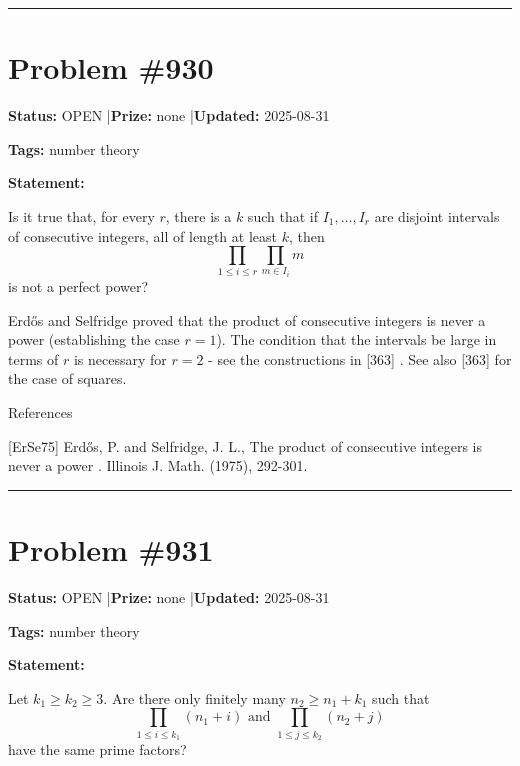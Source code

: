 \documentclass{article}
\begin{document}
\noindent\rule{\linewidth}{0.4pt}


\section{Problem \#930}
\label{prob:930}

\noindent\textbf{Status:} OPEN \quad|\quad \textbf{Prize:} none \quad|\quad \textbf{Updated:} 2025-08-31

\noindent\textbf{Tags:} number theory

\medskip

\noindent\textbf{Statement:}

Is it true that, for every $r$, there is a $k$ such that if $I_1,\ldots,I_r$ are disjoint intervals of consecutive integers, all of length at least $k$, then\[\prod_{1\leq i\leq r}\prod_{m\in I_i}m\]is not a perfect power?




Erd\H{o}s and Selfridge \cite{ErSe75} proved that the product of consecutive integers is never a power (establishing the case $r=1$). The condition that the intervals be large in terms of $r$ is necessary for $r=2$ - see the constructions in [363] . See also [363] for the case of squares.




References

[ErSe75] Erd\H{o}s, P. and Selfridge, J. L., The product of consecutive integers is never a power . Illinois J. Math. (1975), 292-301.

\noindent\rule{\linewidth}{0.4pt}


\section{Problem \#931}
\label{prob:931}

\noindent\textbf{Status:} OPEN \quad|\quad \textbf{Prize:} none \quad|\quad \textbf{Updated:} 2025-08-31

\noindent\textbf{Tags:} number theory

\medskip

\noindent\textbf{Statement:}

Let $k_1\geq k_2\geq 3$. Are there only finitely many $n_2\geq n_1+k_1$ such that\[\prod_{1\leq i\leq k_1}(n_1+i)\textrm{ and }\prod_{1\leq j\leq k_2}(n_2+j)\]have the same prime factors?
\end{document}
